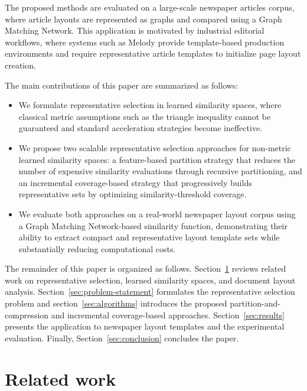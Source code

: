 \documentclass{ieeeaccess}
\newcommand{\toblack}{\color{black}}
\newcommand{\tored}{\color{red}}
\newcommand{\pk}[1]{{\tored [{\bfseries Pierre}: {\itshape #1}] \toblack}}
\begin{document}
The proposed methods are evaluated on a large-scale newspaper articles corpus, where article layouts are represented as graphs and compared using a Graph Matching Network. This application is motivated by industrial editorial workflows, where systems such as Melody provide template-based production environments and require representative article templates to initialize page layout creation.

The main contributions of this paper are summarized as follows:
\begin{itemize}
\item We formulate representative selection in learned similarity spaces, where classical metric assumptions such as the triangle inequality cannot be guaranteed and standard acceleration strategies become ineffective.
\item We propose two scalable representative selection approaches for non-metric learned similarity spaces: a feature-based partition strategy that reduces the number of expensive similarity evaluations through recursive partitioning, and an incremental coverage-based strategy that progressively builds representative sets by optimizing similarity-threshold coverage.
\item We evaluate both approaches on a real-world newspaper layout corpus using a Graph Matching Network-based similarity function, demonstrating their ability to extract compact and representative layout template sets while substantially reducing computational costs.
\end{itemize}

The remainder of this paper is organized as follows. Section~\ref{sec:related-work} reviews related work on representative selection, learned similarity spaces, and document layout analysis. Section~\ref{sec:problem-statement} formulates the representative selection problem and section~\ref{sec:algorithms} introduces the proposed partition-and-compression and incremental coverage-based approaches. Section~\ref{sec:results} presents the application to newspaper layout templates and the experimental evaluation. Finally, Section~\ref{sec:conclusion} concludes the paper.

\section{Related work}
\label{sec:related-work}

\end{document}
